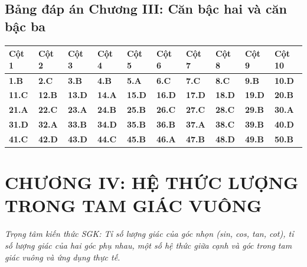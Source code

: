 \documentclass[11pt,a4paper]{article}
\begin{document}
\subsection*{\color{primary} Bảng đáp án Chương III: Căn bậc hai và căn bậc ba}
\begin{center}
\renewcommand{\arraystretch}{1.25}
\begin{tabularx}{\textwidth}{*{10}{>{\centering\arraybackslash}X}}
\toprule
\textbf{\color{primary} Cột 1} & \textbf{\color{primary} Cột 2} & \textbf{\color{primary} Cột 3} & \textbf{\color{primary} Cột 4} & \textbf{\color{primary} Cột 5} & \textbf{\color{primary} Cột 6} & \textbf{\color{primary} Cột 7} & \textbf{\color{primary} Cột 8} & \textbf{\color{primary} Cột 9} & \textbf{\color{primary} Cột 10} \\
\midrule
\textbf{1.B} & \textbf{2.C} & \textbf{3.B} & \textbf{4.B} & \textbf{5.A} & \textbf{6.C} & \textbf{7.C} & \textbf{8.C} & \textbf{9.B} & \textbf{10.D} \\
\rowcolor{rowtint} \textbf{11.C} & \textbf{12.B} & \textbf{13.D} & \textbf{14.A} & \textbf{15.D} & \textbf{16.D} & \textbf{17.D} & \textbf{18.D} & \textbf{19.D} & \textbf{20.B} \\
\textbf{21.A} & \textbf{22.C} & \textbf{23.A} & \textbf{24.B} & \textbf{25.B} & \textbf{26.C} & \textbf{27.C} & \textbf{28.C} & \textbf{29.B} & \textbf{30.A} \\
\rowcolor{rowtint} \textbf{31.D} & \textbf{32.A} & \textbf{33.B} & \textbf{34.D} & \textbf{35.B} & \textbf{36.B} & \textbf{37.A} & \textbf{38.C} & \textbf{39.B} & \textbf{40.D} \\
\textbf{41.C} & \textbf{42.D} & \textbf{43.D} & \textbf{44.C} & \textbf{45.B} & \textbf{46.A} & \textbf{47.B} & \textbf{48.D} & \textbf{49.B} & \textbf{50.B} \\
\bottomrule
\end{tabularx}
\end{center}\vspace{10pt}
\section*{\color{primary} CHƯƠNG IV: HỆ THỨC LƯỢNG TRONG TAM GIÁC VUÔNG}
\textit{Trọng tâm kiến thức SGK: Tỉ số lượng giác của góc nhọn (sin, cos, tan, cot), tỉ số lượng giác của hai góc phụ nhau, một số hệ thức giữa cạnh và góc trong tam giác vuông và ứng dụng thực tế.}\par\vspace{4pt}
\end{document}
